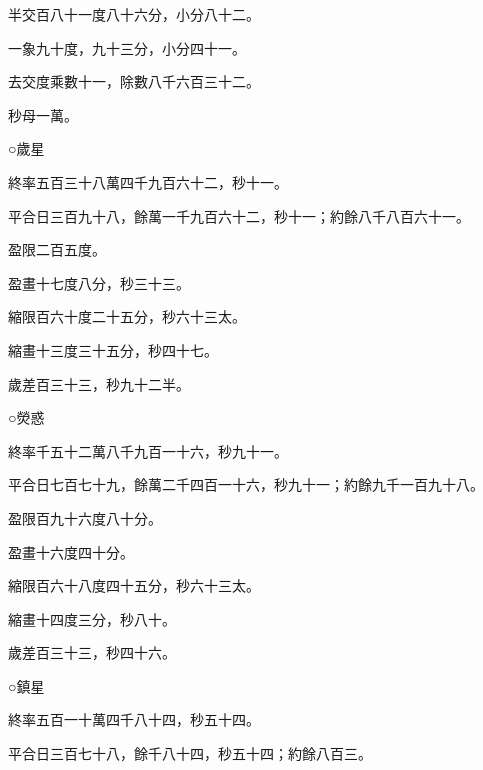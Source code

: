 \begin{pinyinscope}
 半交百八十一度八十六分，小分八十二。



 一象九十度，九十三分，小分四十一。



 去交度乘數十一，除數八千六百三十二。



 秒母一萬。



 ○歲星



 終率五百三十八萬四千九百六十二，秒十一。



 平合日三百九十八，餘萬一千九百六十二，秒十一；約餘八千八百六十一。



 盈限二百五度。



 盈畫十七度八分，秒三十三。



 縮限百六十度二十五分，秒六十三太。



 縮畫十三度三十五分，秒四十七。



 歲差百三十三，秒九十二半。



 ○熒惑



 終率千五十二萬八千九百一十六，秒九十一。



 平合日七百七十九，餘萬二千四百一十六，秒九十一；約餘九千一百九十八。



 盈限百九十六度八十分。



 盈畫十六度四十分。



 縮限百六十八度四十五分，秒六十三太。



 縮畫十四度三分，秒八十。



 歲差百三十三，秒四十六。



 ○鎮星



 終率五百一十萬四千八十四，秒五十四。



 平合日三百七十八，餘千八十四，秒五十四；約餘八百三。




\end{pinyinscope}
